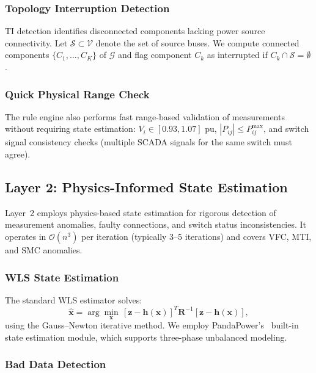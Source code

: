 \documentclass[research]{fcs}
\begin{document}
\subsubsection{Topology Interruption Detection}

TI detection identifies disconnected components lacking power source connectivity. Let $\mathcal{S} \subset \mathcal{V}$ denote the set of source buses. We compute connected components $\{C_1, \ldots, C_K\}$ of $\mathcal{G}$ and flag component $C_k$ as interrupted if $C_k \cap \mathcal{S} = \emptyset$.

\subsubsection{Quick Physical Range Check}

The rule engine also performs fast range-based validation of measurements without requiring state estimation: $V_i \in [0.93, 1.07]$ pu, $|P_{ij}| \leq P_{ij}^{\max}$, and switch signal consistency checks (multiple SCADA signals for the same switch must agree).

\subsection{Layer 2: Physics-Informed State Estimation}

Layer~2 employs physics-based state estimation for rigorous detection of measurement anomalies, faulty connections, and switch status inconsistencies. It operates in $\mathcal{O}(n^3)$ per iteration (typically 3--5 iterations) and covers VFC, MTI, and SMC anomalies.

\subsubsection{WLS State Estimation}

The standard WLS estimator solves:
\begin{equation}
\hat{\mathbf{x}} = \arg\min_{\mathbf{x}}\, [\mathbf{z} - \mathbf{h}(\mathbf{x})]^T \mathbf{R}^{-1} [\mathbf{z} - \mathbf{h}(\mathbf{x})],
\end{equation}
using the Gauss--Newton iterative method. We employ PandaPower's~\cite{pandapower2018} built-in state estimation module, which supports three-phase unbalanced modeling.

\subsubsection{Bad Data Detection}
\end{document}
